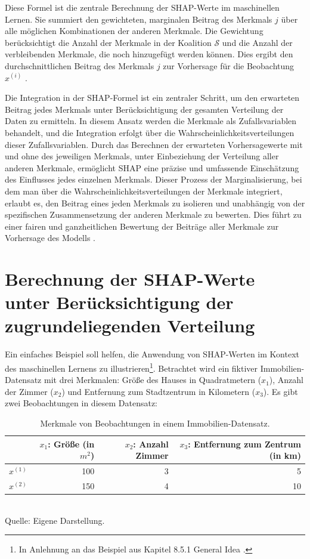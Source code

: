 Diese Formel ist die zentrale Berechnung der SHAP-Werte im maschinellen Lernen. 
Sie summiert den gewichteten, marginalen Beitrag des Merkmals $j$ über alle möglichen Kombinationen der anderen Merkmale. 
Die Gewichtung berücksichtigt die Anzahl der Merkmale in der Koalition $\mathcal{S}$ und die Anzahl der verbleibenden Merkmale, 
die noch hinzugefügt werden können. Dies ergibt den durchschnittlichen Beitrag des Merkmals $j$ zur Vorhersage für die 
Beobachtung $x^{(i)}$ \cite[S. 29, 30]{Molnar_2023}.

Die Integration in der SHAP-Formel ist ein zentraler Schritt, um den erwarteten Beitrag jedes Merkmals unter 
Berücksichtigung der gesamten Verteilung der Daten zu ermitteln. 
In diesem Ansatz werden die Merkmale als Zufallsvariablen behandelt, und die Integration erfolgt über 
die Wahrscheinlichkeitsverteilungen dieser Zufallsvariablen. Durch das Berechnen der erwarteten Vorhersagewerte mit 
und ohne des jeweiligen Merkmals, unter Einbeziehung der Verteilung aller anderen Merkmale, 
ermöglicht SHAP eine präzise und umfassende Einschätzung des Einflusses jedes einzelnen Merkmals. 
Dieser Prozess der Marginalisierung, bei dem man über die Wahrscheinlichkeitsverteilungen der Merkmale integriert, 
erlaubt es, den Beitrag eines jeden Merkmals zu isolieren und unabhängig von der spezifischen Zusammensetzung 
der anderen Merkmale zu bewerten. Dies führt zu einer fairen und ganzheitlichen Bewertung der Beiträge aller Merkmale 
zur Vorhersage des Modells \cite[S. 28]{Molnar_2023}.

\section{Berechnung der SHAP-Werte unter Berücksichtigung der zugrundeliegenden Verteilung}
\label{sec:example}

Ein einfaches Beispiel soll helfen, die Anwendung von SHAP-Werten im 
Kontext des maschinellen Lernens zu illustrieren\footnote{In Anlehnung an das Beispiel aus Kapitel 8.5.1 \glqq{}General Idea\grqq{} \cite[S.215f]{Molnar_2022}.}. Betrachtet wird ein fiktiver 
Immobilien-Datensatz mit drei Merkmalen: Größe des Hauses in Quadratmetern ($x_1$), Anzahl der Zimmer ($x_2$) 
und Entfernung zum Stadtzentrum in Kilometern ($x_3$). Es gibt zwei Beobachtungen in diesem Datensatz:

\begin{table}[h]
    \caption{Merkmale von Beobachtungen in einem Immobilien-Datensatz.}
    \footnotesize
    \begin{tabularx}{\textwidth}{Xrrr}
    \toprule
     & $x_1$: Größe (in $m^2$) &  $x_2$: Anzahl Zimmer &  $x_3$: Entfernung zum Zentrum (in km) \\
    \midrule
    $x^{(1)}$ & 100 & 3 & 5 \\
    $x^{(2)}$ & 150 & 4 & 10 \\
    \bottomrule
    \end{tabularx}
    \label{tab:example}
    \normalsize\\
    Quelle: Eigene Darstellung.
\end{table}

